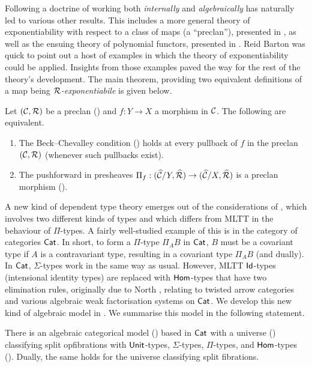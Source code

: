 Following a doctrine of working both \emph{internally} and \emph{algebraically}
has naturally led to various other results.
This includes a more general theory of exponentiability
with respect to a class of maps (a ``preclan''),
presented in ,
as well as the ensuing theory of polynomial functors,
presented in .
Reid Barton was quick to point out a host of examples
in which the theory of exponentiability could be applied.
Insights from those examples paved the way for the rest of
the theory's development.
The main theorem, providing two equivalent definitions of
a map being \emph{$\mathcal{R}$-exponentiabile} is given below.

\begin{theorem*}
  Let $(\mathcal{C},\mathcal{R})$ be a preclan ()
  and $f : Y \to X$ a morphism in $\mathcal{C}$.
  The following are equivalent.
  \begin{enumerate}
  \item
    The Beck--Chevalley condition () holds at every pullback of
    $f$ in the preclan $(\mathcal{C},\mathcal{R})$
    (whenever such pullbacks exist).
  \item
    The pushforward in presheaves $\Pi_f : (\widehat{\mathcal{C}}/Y, \widehat{\mathcal{R}}) \to (\widehat{\mathcal{C}}/X, \widehat{\mathcal{R}})$
    is a preclan morphism ().
  \end{enumerate}
\end{theorem*}

A new kind of dependent type theory emerges out of
the considerations of ,
which involves two different kinds of types and
which differs from MLTT in the behaviour of $\Pi$-types.
A fairly well-studied example of this is in the category of categories $\mathsf{Cat}$.
In short, to form a $\Pi$-type $\Pi_A B$ in $\mathsf{Cat}$,
$B$ must be a covariant type if $A$ is a contravariant type,
resulting in a covariant type $\Pi_A B$ (and dually).
In $\mathsf{Cat}$, $\Sigma$-types work in the same way as usual.
However, MLTT $\mathsf{Id}$-types (intensional identity types) are replaced with
$\mathsf{Hom}$-types that have two elimination rules,
originally due to North \cite{north2019},
relating to twisted arrow categories and various algebraic weak factorisation systems on $\mathsf{Cat}$.
We develop this new kind of algebraic model in .
We summarise this model in the following statement.

\begin{theorem*}
  There is an algebraic categorical model () based in $\mathsf{Cat}$
  with a universe () classifying split opfibrations with
  $\mathsf{Unit}$-types, $\Sigma$-types, $\Pi$-types,
  and $\mathsf{Hom}$-types ().
  Dually, the same holds for the universe classifying split fibrations.
\end{theorem*}

